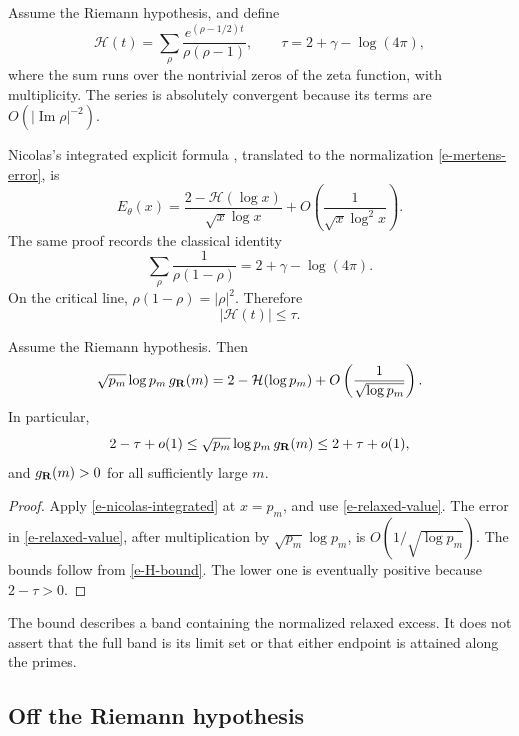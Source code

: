 Assume the Riemann hypothesis, and define
\[
    \mathcal H(t)
    =
    \sum_\rho
    \frac{e^{(\rho-1/2)t}}{\rho(\rho-1)},
    \qquad
    \tau=2+\gamma-\log(4\pi),
\]
where the sum runs over the nontrivial zeros of the zeta function, with
multiplicity. The series is absolutely convergent because its terms are
\(O(|\operatorname{Im}\rho|^{-2})\).

Nicolas's integrated explicit formula
\cite[Theorem~3(b), final formula in its proof]
{nicolas-1983-petites-valeurs}, translated to the normalization
\eqref{e-mertens-error}, is
\begin{equation}
\label{e-nicolas-integrated}
    E_\theta(x)
    =
    \frac{2-\mathcal H(\log x)}
         {\sqrt x\log x}
    +
    O\left(\frac{1}{\sqrt x\log^2x}\right).
\end{equation}
The same proof records the classical identity
\[
    \sum_\rho\frac{1}{\rho(1-\rho)}
    =
    2+\gamma-\log(4\pi).
\]
On the critical line, \(\rho(1-\rho)=|\rho|^2\). Therefore
\begin{equation}
\label{e-H-bound}
    |\mathcal H(t)|\leq\tau.
\end{equation}

\begin{theorem}
\label{thm-rh-relaxed}
Assume the Riemann hypothesis. Then
\[
    \sqrt{p_m}\log p_m\,g_{\mathbf{R}}(m)
    =
    2-\mathcal H(\log p_m)
    +O\left(\frac1{\sqrt{\log p_m}}\right).
\]
In particular,
\[
    2-\tau+o(1)
    \leq
    \sqrt{p_m}\log p_m\,g_{\mathbf{R}}(m)
    \leq
    2+\tau+o(1),
\]
and \(g_{\mathbf{R}}(m)>0\) for all sufficiently large \(m\).
\end{theorem}

\begin{proof}
Apply \eqref{e-nicolas-integrated} at \(x=p_m\), and use
\eqref{e-relaxed-value}. The error in \eqref{e-relaxed-value}, after
multiplication by \(\sqrt{p_m}\log p_m\), is
\(O(1/\sqrt{\log p_m})\). The bounds follow from
\eqref{e-H-bound}. The lower one is eventually positive because
\(2-\tau>0\).
\end{proof}

The bound describes a band containing the normalized relaxed excess. It
does not assert that the full band is its limit set or that either
endpoint is attained along the primes.

\subsection{Off the Riemann hypothesis}
\label{s-off-rh-branch}

